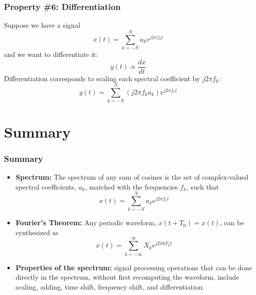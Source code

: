 \documentclass{beamer}
\begin{document}
\begin{frame}
  \frametitle{Property \#6: Differentiation}

  Suppose we have a signal
  \[
  x(t) = \sum_{k=-N}^N a_ke^{j2\pi f_kt}
  \]
  and we want to differentiate it:
  \[
  y(t) \propto \frac{dx}{dt}
  \]
  Differentiation corresponds to scaling each spectral coefficient by
  $j2\pi f_k$:
  \[
  y(t) = \sum_{k=-N}^N \left(j2\pi f_k a_k\right)e^{j2\pi f_kt}
  \]
\end{frame}

\section[Summary]{Summary}
\setcounter{subsection}{1}

\begin{frame}
  \frametitle{Summary}
  \begin{itemize}
  \item {\bf Spectrum:} The spectrum of any sum of cosines is the set
    of complex-valued spectral coefficients, $a_k$, matched with the
    frequencies $f_k$, such that
    \[
    x(t) = \sum_{k=-N}^N a_ke^{j2\pi f_kt}
    \]
  \item {\bf Fourier's Theorem:} Any periodic waveform,
    $x(t+T_0)=x(t)$, can be synthesized as
    \[
    x(t) = \sum_{k=-\infty}^\infty X_ke^{j2\pi kF_0t}
    \]
  \item {\bf Properties of the spectrum:} signal processing operations
    that can be done directly in the spectrum, without first
    recomputing the waveform, include scaling, adding, time shift,
    frequency shift, and differentiation.
  \end{itemize}
  
\end{frame}
\end{document}
